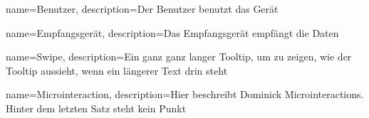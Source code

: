 {
    name=Benutzer,
    description={Der Benutzer benutzt das Gerät}
}

{
    name=Empfangsgerät,
    description={Das Empfangsgerät empfängt die Daten}
}

{
    name=Swipe,
    description={Ein ganz ganz langer Tooltip, um zu zeigen, wie der Tooltip aussieht, wenn ein längerer Text drin steht}
}

{
    name=Microinteraction,
    description={Hier beschreibt Dominick Microinteractions. Hinter dem letzten Satz steht kein Punkt}
}